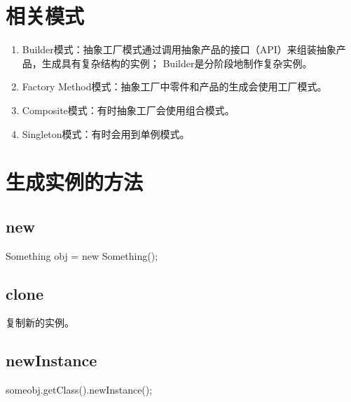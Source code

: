 \section{相关模式}

\begin{enumerate}
	\item Builder模式：抽象工厂模式通过调用抽象产品的接口（API）来组装抽象产品，生成具有复杂结构的实例；
	Builder是分阶段地制作复杂实例。
	\item Factory Method模式：抽象工厂中零件和产品的生成会使用工厂模式。
	\item Composite模式：有时抽象工厂会使用组合模式。
	\item Singleton模式：有时会用到单例模式。
\end{enumerate}
\section{生成实例的方法}
\subsection{new}
Something obj = new Something();
\subsection{clone}
复制新的实例。
\subsection{newInstance}
someobj.getClass().newInstance();